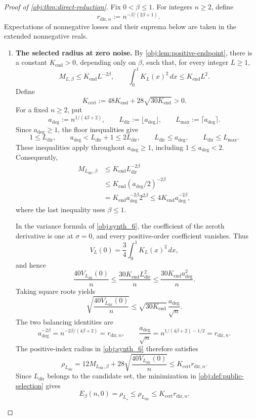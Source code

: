 \documentclass[11pt]{article}
\begin{document}
\begin{proof}[Proof of \cref{obj:thm:direct-reduction}]
Fix \(0<\beta\le1\). For integers \(n\ge2\), define
\[
r_{\mathrm{dir},n}:=n^{-\beta/(2\beta+1)}.
\]
Expectations of nonnegative losses and their suprema below are taken in the extended nonnegative reals.

\begin{enumerate}
\item \textbf{The selected radius at zero noise.}
By \cref{obj:lem:positive-endpoint}, there is a constant \(K_{\mathrm{end}}>0\), depending only on \(\beta\), such that, for every integer \(L\ge1\),
\[
M_{L,\beta}\le K_{\mathrm{end}}L^{-2\beta},
\qquad
\int_0^1 K_L(x)^2\,dx\le K_{\mathrm{end}}L^2.
\]
Define
\[
K_{\mathrm{cert}}
:=48K_{\mathrm{end}}+28\sqrt{30K_{\mathrm{end}}}>0.
\]
For a fixed \(n\ge2\), put
\[
a_{\mathrm{deg}}:=n^{1/(4\beta+2)},
\qquad
L_{\mathrm{dir}}:=\lfloor a_{\mathrm{deg}}\rfloor,
\qquad
L_{\max}:=\lceil a_{\mathrm{deg}}\rceil.
\]
Since \(a_{\mathrm{deg}}\ge1\), the floor inequalities give
\[
1\le L_{\mathrm{dir}},
\qquad
a_{\mathrm{deg}}<L_{\mathrm{dir}}+1\le2L_{\mathrm{dir}},
\qquad
L_{\mathrm{dir}}\le a_{\mathrm{deg}},
\qquad
L_{\mathrm{dir}}\le L_{\max}.
\]
These inequalities apply throughout \(a_{\mathrm{deg}}\ge1\), including \(1\le a_{\mathrm{deg}}<2\). Consequently,
\[
\begin{aligned}
M_{L_{\mathrm{dir}},\beta}
&\le K_{\mathrm{end}}L_{\mathrm{dir}}^{-2\beta}\\
&\le K_{\mathrm{end}}(a_{\mathrm{deg}}/2)^{-2\beta}\\
&=K_{\mathrm{end}}a_{\mathrm{deg}}^{-2\beta}2^{2\beta}
\le4K_{\mathrm{end}}a_{\mathrm{deg}}^{-2\beta},
\end{aligned}
\]
where the last inequality uses \(\beta\le1\).

In the variance formula of \cref{obj:synth_6}, the coefficient of the zeroth derivative is one at \(\sigma=0\), and every positive-order coefficient vanishes. Thus
\[
V_L(0)=\frac34\int_0^1K_L(x)^2\,dx,
\]
and hence
\[
\frac{40V_{L_{\mathrm{dir}}}(0)}{n}
\le\frac{30K_{\mathrm{end}}L_{\mathrm{dir}}^2}{n}
\le\frac{30K_{\mathrm{end}}a_{\mathrm{deg}}^2}{n}.
\]
Taking square roots yields
\[
\sqrt{\frac{40V_{L_{\mathrm{dir}}}(0)}{n}}
\le\sqrt{30K_{\mathrm{end}}}\,
\frac{a_{\mathrm{deg}}}{\sqrt n}.
\]
The two balancing identities are
\[
a_{\mathrm{deg}}^{-2\beta}
=n^{-2\beta/(4\beta+2)}
=r_{\mathrm{dir},n},
\qquad
\frac{a_{\mathrm{deg}}}{\sqrt n}
=n^{1/(4\beta+2)-1/2}
=r_{\mathrm{dir},n}.
\]
The positive-index radius in \cref{obj:synth_6} therefore satisfies
\[
\rho_{L_{\mathrm{dir}}}
=12M_{L_{\mathrm{dir}},\beta}
+28\sqrt{\frac{40V_{L_{\mathrm{dir}}}(0)}{n}}
\le K_{\mathrm{cert}}r_{\mathrm{dir},n}.
\]
Since \(L_{\mathrm{dir}}\) belongs to the candidate set, the minimization in \cref{obj:def:public-selection} gives
\[
E_\beta(n,0)=\rho_{L_\star}
\le\rho_{L_{\mathrm{dir}}}
\le K_{\mathrm{cert}}r_{\mathrm{dir},n}.
\]


\end{enumerate}
\end{proof}
\end{document}
